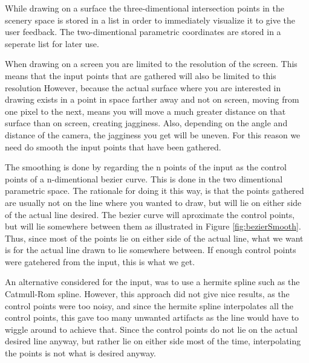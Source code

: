 \documentclass[a4paper,12pt]{report}
\begin{document}
While drawing on a surface the three-dimentional intersection points in the scenery space is stored in a list in order to immediately visualize it to give the user feedback. The two-dimentional parametric coordinates are stored in a seperate list for later use.

When drawing on a screen you are limited to the resolution of the screen. This means that the input points that are gathered will also be limited to this resolution However, because the actual surface where you are interested in drawing exists in a point in space farther away and not on screen, moving from one pixel to the next, means you will move a much greater distance on that surface than on screen, creating jagginess. Also, depending on the angle and distance of the camera, the jagginess you get will be uneven. For this reason we need do smooth the input points that have been gathered. 

The smoothing is done by regarding the n points of the  input as the control points of a n-dimentional bezier curve. This is done in the two dimentional parametric space. The rationale for doing it this way, is that the points gathered are usually not on the line where you wanted to draw, but will lie on either side of the actual line desired. The bezier curve will aproximate the control points, but will lie somewhere between them as illustrated in Figure \ref{fig:bezierSmooth}. Thus, since most of the points lie on either side of the actual line, what we want is for the actual line drawn to lie somewhere between. If enough control points were gatehered from the input, this is what we get.

An alternative considered for the input, was to use a hermite spline such as the Catmull-Rom spline. However, this approach did not give nice results, as the control points were too noisy, and since the hermite spline interpolates all the control points, this gave too many unwanted artifacts as the line would have to wiggle around to achieve that. Since the control points do not lie on the actual desired line anyway, but rather lie on either side most of the time, interpolating the points is not what is desired anyway.
\end{document}

